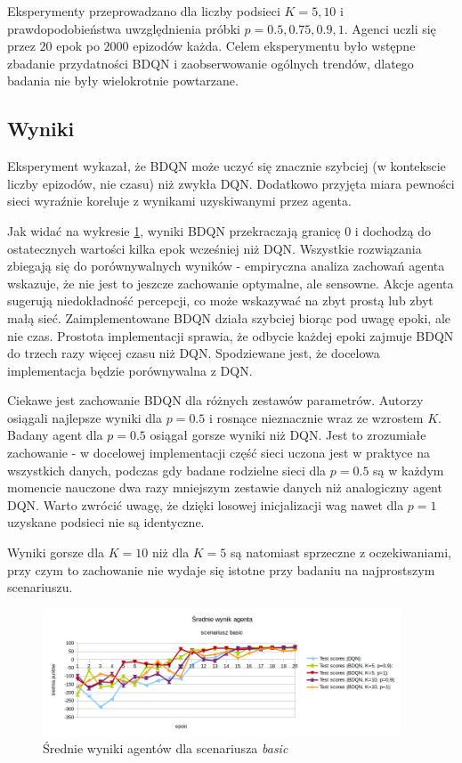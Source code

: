 Eksperymenty przeprowadzano dla liczby podsieci $K=5,10$ i prawdopodobieństwa uwzględnienia próbki $p=0.5,0.75,0.9,1$. Agenci uczli się przez $20$ epok po $2000$ epizodów każda. Celem eksperymentu było wstępne zbadanie przydatności BDQN i zaobserwowanie ogólnych trendów, dlatego badania nie były wielokrotnie powtarzane.

\subsection{Wyniki}
Eksperyment wykazał, że BDQN może uczyć się znacznie szybciej (w kontekscie liczby epizodów, nie czasu) niż zwykła DQN. Dodatkowo przyjęta miara pewności sieci wyraźnie koreluje z wynikami uzyskiwanymi przez agenta.

Jak widać na wykresie \ref{fig:naive_bdqn_test_scores}, wyniki BDQN przekraczają granicę 0 i dochodzą do ostatecznych wartości kilka epok wcześniej niż DQN. Wszystkie rozwiązania zbiegają się do porównywalnych wyników - empiryczna analiza zachowań agenta wskazuje, że nie jest to jeszcze zachowanie optymalne, ale sensowne. Akcje agenta sugerują niedokładność percepcji, co może wskazywać na zbyt prostą lub zbyt małą sieć.
Zaimplementowane BDQN działa szybciej biorąc pod uwagę epoki, ale nie czas. Prostota implementacji sprawia, że odbycie każdej epoki zajmuje BDQN do trzech razy więcej czasu niż DQN. Spodziewane jest, że docelowa implementacja będzie porównywalna z DQN.

Ciekawe jest zachowanie BDQN dla różnych zestawów parametrów. Autorzy \cite{DBLP:journals/corr/OsbandBPR16} osiągali najlepsze wyniki dla $p=0.5$ i rosnące nieznacznie wraz ze wzrostem $K$. Badany agent dla $p=0.5$ osiągał gorsze wyniki niż DQN. Jest to zrozumiałe zachowanie - w docelowej implementacji część sieci uczona jest w praktyce na wszystkich danych, podczas gdy badane rodzielne sieci dla $p=0.5$ są w każdym momencie nauczone dwa razy mniejszym zestawie danych niż analogiczny agent DQN. Warto zwrócić uwagę, że dzięki losowej inicjalizacji wag nawet dla $p=1$ uzyskane podsieci nie są identyczne.

Wyniki gorsze dla $K=10$ niż dla $K=5$ są natomiast sprzeczne z oczekiwaniami, przy czym to zachowanie nie wydaje się istotne przy badaniu na najprostszym scenariuszu.

\begin{figure}[H]
    \centering
    \includegraphics[width=0.95\textwidth]{figures/figures/naive_bdqn_test_scores.png}
    \caption{Średnie wyniki agentów dla scenariusza \textit{basic}}
    \label{fig:naive_bdqn_test_scores}
\end{figure}

